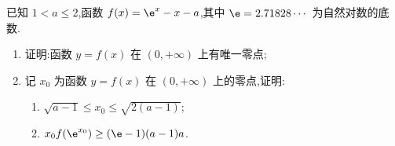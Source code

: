 \begin{problem}
已知 \(1<a\le2\),函数 \(f(x)=\e^x-x-a\),其中 \(\e=2.71828\cdots\) 为自然对数的底数.

\begin{enumerate}
\item 证明:函数 \(y=f(x)\) 在 \((0,+\infty)\) 上有唯一零点;

\item 记 \(x_0\) 为函数 \(y=f(x)\) 在 \((0,+\infty)\) 上的零点,证明:

\begin{enumerate}
\item \(\sqrt{a-1}\le x_0\le\sqrt{2(a-1)}\);
\item \(x_0f(\e^{x_0})\ge(\e-1)(a-1)a\).
\end{enumerate}
\end{enumerate}
\end{problem}

